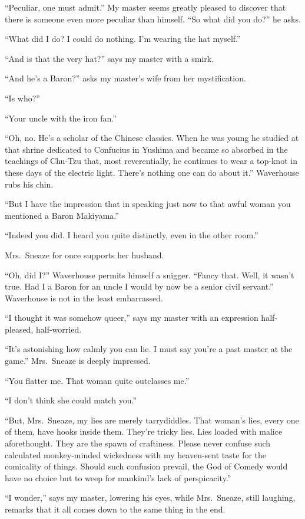 \documentclass{book}
\begin{document}
``Peculiar, one must admit.'' My master seems greatly pleased to
discover that there is someone even more peculiar than himself. ``So
what did you do?'' he asks.

``What did I do? I could do nothing. I'm wearing the hat myself.''

``And is that the very hat?'' says my master with a smirk.

``And he's a Baron?'' asks my master's wife from her mystification.

``Is who?''

``Your uncle with the iron fan.''

``Oh, no. He's a scholar of the Chinese classics. When he was young he
studied at that shrine dedicated to Confucius in Yushima and became so
absorbed in the teachings of Chu-Tzu that, most reverentially, he
continues to wear a top-knot in these days of the electric light.
There's nothing one can do about it.'' Waverhouse rubs his chin.

``But I have the impression that in speaking just now to that awful
woman you mentioned a Baron Makiyama.''

``Indeed you did. I heard you quite distinctly, even in the other
room.''

Mrs.~Sneaze for once supports her husband.

``Oh, did I?'' Waverhouse permits himself a snigger. ``Fancy that. Well,
it wasn't true. Had I a Baron for an uncle I would by now be a senior
civil servant.'' Waverhouse is not in the least embarrassed.

``I thought it was somehow queer,'' says my master with an expression
half-pleased, half-worried.

``It's astonishing how calmly you can lie. I must say you're a past
master at the game.'' Mrs.~Sneaze is deeply impressed.

``You flatter me. That woman quite outclasses me.''

``I don't think she could match you.''

``But, Mrs.~Sneaze, my lies are merely tarrydiddles. That woman's lies,
every one of them, have hooks inside them. They're tricky lies. Lies
loaded with malice aforethought. They are the spawn of craftiness.
Please never confuse such calculated monkey-minded wickedness with my
heaven-sent taste for the comicality of things. Should such confusion
prevail, the God of Comedy would have no choice but to weep for
mankind's lack of perspicacity.''

``I wonder,'' says my master, lowering his eyes, while Mrs.~Sneaze,
still laughing, remarks that it all comes down to the same thing in the
end.
\end{document}
